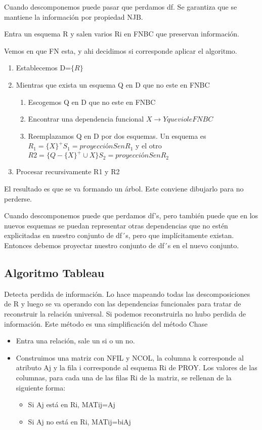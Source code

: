 Cuando descomponemos puede pasar que perdamos df. Se garantiza que se mantiene la información por propiedad NJB.

Entra un esquema R y salen varios Ri en FNBC que preservan información.

Vemos en que FN esta, y ahi decidimos si corresponde aplicar el algoritmo.
\begin{enumerate}
\item Establecemos D=$\{R\}$
\item Mientras que exista un esquema Q en D que no este en FNBC
\begin{enumerate}
    \item Escogemos Q en D que no este en FNBC
    \item Encontrar una dependencia funcional $X\rightarrow Y que viole FNBC$
    \item Reemplazamos Q en D por dos esquemas. Un esquema es $R_1 =\{X\}^+ S_1 =proyección S en R_1$ y el otro $R2=\{Q - \{X\}^+ \cup X\} S_2 =proyección S en R_2$
\end{enumerate}
\item Procesar recursivamente R1 y R2
\end{enumerate}

\medskip
El resultado es que se va formando un árbol. Este conviene dibujarlo para no perderse.

Cuando descomponemos puede que perdamos
df’s, pero también puede que en los nuevos
esquemas se puedan representar otras
dependencias que no estén explicitadas en
nuestro conjunto de df´s, pero que
implícitamente existan. Entonces debemos
proyectar nuestro conjunto de df´s en el nuevo
conjunto.


\subsection*{Algoritmo Tableau}
Detecta perdida de información. Lo hace mapeando todas las descomposiciones de R y luego se va operando con las dependencias funcionales para tratar de reconstruir la relación universal. Si podemos reconstruirla no hubo perdida de información. Este método es una simplificación del método Chase

\begin{itemize}
\item Entra una relación, sale un si o un no. 
\item Construimos una matriz con NFIL y NCOL, la columna k corresponde al atributo Aj y la fila i corresponde al esquema Ri de PROY. Los valores de las columnas, para cada una de las filas Ri de la matriz, se rellenan de la siguiente forma:
\begin{itemize}
\item Si Aj está en Ri, MATij=Aj
\item Si Aj no está en Ri, MATij=biAj
\end{itemize}
\end{itemize}

